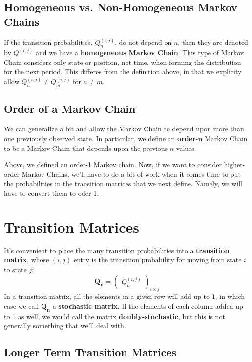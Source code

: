 \documentclass[a4paper,12pt]{scrartcl}
\begin{document}
\subsection{Homogeneous vs. Non-Homogeneous Markov Chains}
If the transition probabilities, $Q_n^{(i,j)}$, do
not depend on $n$, then they are denoted by $Q^{(i,j)}$ and we have
a \textbf{homogeneous Markov Chain}. This type of Markov Chain considers
only state or position, not time, when forming the distribution for the
next period. This differes from the definition above, in that we 
explicity allow $Q_n^{(i,j)} \neq Q_m^{(i,j)}$ for $n\neq m$.

\subsection{Order of a Markov Chain}
We can generalize a bit and allow the Markov Chain to depend upon more
than one previously observed state.  In particular, we define an 
\textbf{order}-$\mathbf{n}$ Markov Chain to be a Markov Chain that 
depends upon the previous $n$ values.  

Above, we defined an order-1 Markov chain. Now, if we want to consider 
higher-order Markov Chains, we'll have to do a bit of work when it
comes time to put the probabilities in the transition matrices that
we next define. Namely, we will have to convert them to oder-1.


\section{Transition Matrices}

It's convenient to place the many transition probabilities into a
\textbf{transition matrix}, whose $(i,j)$ entry is the transition
probability for moving from state $i$ to state $j$:
   \[\mathbf{Q_n}=\begin{pmatrix} Q_n^{(i,j)}\end{pmatrix}_{i \times j}
      \]
In a transition matrix, all the elements in a given row will add up
to 1, in which case we call $\mathbf{Q_n}$ a \textbf{stochastic matrix}.
If the elements of each column added up to 1 as well, we would call
the matrix \textbf{doubly-stochastic}, but this is not generally 
something that we'll deal with.

\subsection{Longer Term Transition Matrices}
\end{document}
